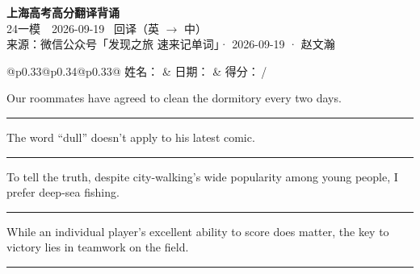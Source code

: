 \documentclass[11pt,a4paper]{article}
\newcommand{\num}[1]{\makebox[1.9em][r]{#1.}\hspace{0.3em}}
\newcommand{\wline}{\noindent\rule{\linewidth}{0.4pt}}
\begin{document}
\pagestyle{plain}
\begin{center}
{\LARGE\bfseries 上海高考高分翻译背诵 }\\[0.25em]
{\large 24一模　2026-09-19 \quad\ 回译（英 $\to$ 中）}\\[0.35em]
{\footnotesize 来源：微信公众号「发现之旅 速来记单词」· 2026-09-19 · 赵文瀚}
\end{center}

\vspace{0.4em}
\noindent\begin{tabular}{@{}p{0.33\textwidth}@{}p{0.34\textwidth}@{}p{0.33\textwidth}@{}}
姓名：\underline{\hspace{2.0cm}} & 日期：\underline{\hspace{2.0cm}} & 得分：\underline{\hspace{1.4cm}}\,/ \\
\end{tabular}

\vspace{0.5em}

\vspace{0.8em}
\num{1}Our roommates have agreed to clean the dormitory every two days.

\vspace{0.25em}

\wline

\num{2}The word “dull” doesn’t apply to his latest comic.

\vspace{0.25em}

\wline

\num{3}To tell the truth, despite city-walking’s wide popularity among young people, I prefer deep-sea fishing.

\vspace{0.25em}

\wline

\num{4}While an individual player’s excellent ability to score does matter, the key to victory lies in teamwork on the field.

\vspace{0.25em}

\wline
\end{document}
